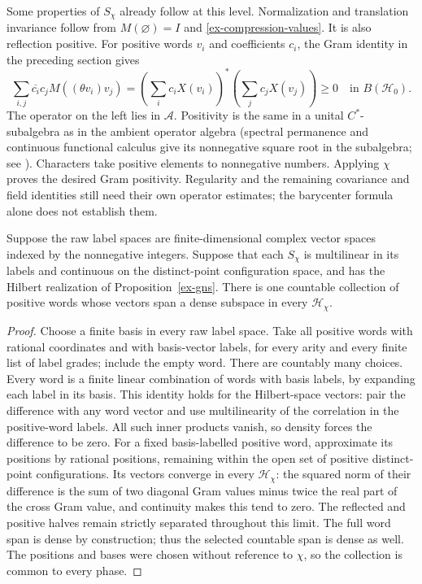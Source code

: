 Some properties of \(S_\chi\) already follow at this level. Normalization
and translation invariance follow from \(M(\varnothing)=I\) and
\eqref{ex-compression-values}. It is also reflection positive. For
positive words \(v_i\) and coefficients \(c_i\), the Gram identity in
the preceding section gives
\[
 \sum_{i,j}\overline{c_i}c_jM((\theta v_i)v_j)
 =\left(\sum_i c_iX(v_i)\right)^*
   \left(\sum_j c_jX(v_j)\right)\ge0
 \quad\text{in }B(\mathcal H_0).
\]
The operator on the left lies in \(\mathcal A\). Positivity is the
same in a unital \(C^*\)-subalgebra as in the ambient operator algebra
(spectral permanence and continuous functional calculus give its nonnegative square root in
the subalgebra; see \cite[Theorems 2.17 and 2.19]{Williams}). Characters take positive elements to nonnegative
numbers. Applying \(\chi\) proves the desired Gram positivity.
Regularity and the remaining covariance and field identities still need
their own operator estimates; the barycenter formula alone does not
establish them.

\begin{lemma}\label{ex-phase-horizon}
Suppose the raw label spaces are finite-dimensional complex vector spaces
indexed by the nonnegative integers. Suppose that each \(S_\chi\) is
multilinear in its labels and continuous on the distinct-point
configuration space, and has the Hilbert realization of
Proposition~\ref{ex-gns}. There is one countable collection of positive
words whose vectors span a dense subspace in every \(\mathcal H_\chi\).
\end{lemma}
\begin{proof}
Choose a finite basis in every raw label space. Take all positive words
with rational coordinates and with basis-vector labels, for every arity
and every finite list of label grades; include the empty word. There are
countably many choices. Every word is a finite linear combination of
words with basis labels, by expanding each label in its basis. This identity holds for the Hilbert-space vectors: pair the difference with any word vector and use multilinearity of the correlation in the positive-word labels. All such inner products vanish, so density forces the difference to be zero.
For a fixed basis-labelled positive word, approximate its positions by
rational positions, remaining within the open set of positive
distinct-point configurations. Its vectors converge in every
\(\mathcal H_\chi\): the squared norm of their difference is the sum
of two diagonal Gram values minus twice the real part of the cross Gram
value, and continuity makes this tend to zero. The reflected and positive
halves remain strictly separated throughout this limit. The full word
span is dense by construction; thus the selected countable span is dense
as well. The positions and bases were chosen without reference to
\(\chi\), so the collection is common to every phase.
\end{proof}

